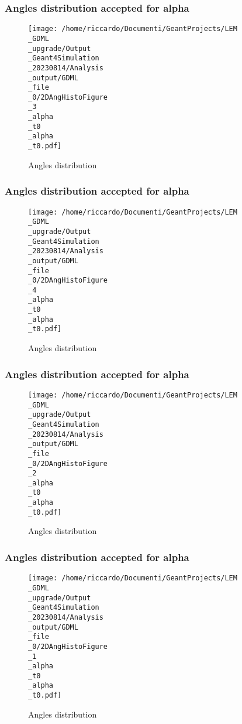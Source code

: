 \documentclass[8pt]{beamer}
\begin{document}
            \begin{frame}
                \frametitle{Angles distribution accepted for alpha}
            
        \begin{figure}[h]
            \centering
            \texttt{[image: /home/riccardo/Documenti/GeantProjects/LEM\\\_GDML\\\_upgrade/Output\\\_Geant4Simulation\\\_20230814/Analysis\\\_output/GDML\\\_file\\\_0/2DAngHistoFigure\\\_3\\\_alpha\\\_t0\\\_alpha\\\_t0.pdf]}
            \caption{Angles distribution}
        \end{figure}
        
            \end{frame}
            
            \begin{frame}
                \frametitle{Angles distribution accepted for alpha}
            
        \begin{figure}[h]
            \centering
            \texttt{[image: /home/riccardo/Documenti/GeantProjects/LEM\\\_GDML\\\_upgrade/Output\\\_Geant4Simulation\\\_20230814/Analysis\\\_output/GDML\\\_file\\\_0/2DAngHistoFigure\\\_4\\\_alpha\\\_t0\\\_alpha\\\_t0.pdf]}
            \caption{Angles distribution}
        \end{figure}
        
            \end{frame}
            
            \begin{frame}
                \frametitle{Angles distribution accepted for alpha}
            
        \begin{figure}[h]
            \centering
            \texttt{[image: /home/riccardo/Documenti/GeantProjects/LEM\\\_GDML\\\_upgrade/Output\\\_Geant4Simulation\\\_20230814/Analysis\\\_output/GDML\\\_file\\\_0/2DAngHistoFigure\\\_2\\\_alpha\\\_t0\\\_alpha\\\_t0.pdf]}
            \caption{Angles distribution}
        \end{figure}
        
            \end{frame}
            
            \begin{frame}
                \frametitle{Angles distribution accepted for alpha}
            
        \begin{figure}[h]
            \centering
            \texttt{[image: /home/riccardo/Documenti/GeantProjects/LEM\\\_GDML\\\_upgrade/Output\\\_Geant4Simulation\\\_20230814/Analysis\\\_output/GDML\\\_file\\\_0/2DAngHistoFigure\\\_1\\\_alpha\\\_t0\\\_alpha\\\_t0.pdf]}
            \caption{Angles distribution}
        \end{figure}
        
            \end{frame}
            
\end{document}
